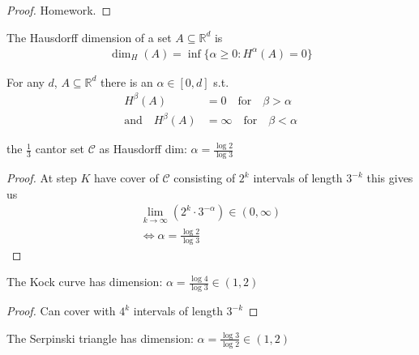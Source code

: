 \begin{proof}
	Homework.
\end{proof}

\begin{definition}
	The Hausdorff dimension of a set $A \subseteq \mathbb{R}^d$ is
	\begin{align*}
		\dim_{H} (A) = \inf\{\alpha \geq 0 : H^{\alpha} (A) = 0 \}
	\end{align*}
\end{definition}

\begin{lemma}
	For any $d$, $A \subseteq \mathbb{R}^d$ there is an $\alpha \in [0,d]$ s.t.
	\begin{align*}
					H^{\beta} (A) &= 0 \quad \text{for} \quad  \beta > \alpha \\
		\text{and} \quad H^{\beta} (A) &= \infty \quad \text{for} \quad \beta < \alpha
	\end{align*}
\end{lemma}


\begin{example}
	the $\frac{1}{3}$ cantor set $\mathcal{C}$ as Hausdorff dim: $\alpha = \frac{\log 2}{\log 3}$
	\begin{proof}
		At step $K$ have cover of $\mathcal{C}$ consisting of $2^{k}$ intervals of length $3^{-k}$ this gives us
		\begin{align*}
		\lim_{k \to \infty} (2^{k}\cdot 3^{-\alpha}) \in (0, \infty) \\
		\iff \alpha = \frac{\log 2}{\log 3}
		\end{align*}
	\end{proof}

\end{example}

\begin{example}
	The Kock curve has dimension: $\alpha = \frac{\log 4}{\log 3} \in (1,2)$
	\begin{proof}
		Can cover with $4^{k}$ intervals of length $3^{-k}$
	\end{proof}

\end{example}

\begin{example}
	The Serpinski triangle has dimension: $\alpha = \frac{\log 3}{\log 2} \in (1,2)$
\end{example}

